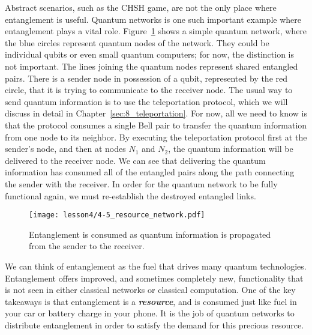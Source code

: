 Abstract scenarios, such as the CHSH game, are not the only place where entanglement is useful.
Quantum networks is one such important example where entanglement plays a vital role.
Figure~\ref{fig:4-5_resource_network} shows a simple quantum network, where the blue circles represent quantum nodes of the network.
They could be individual qubits or even small quantum computers; for now, the distinction is not important.
The lines joining the quantum nodes represent shared entangled pairs.
There is a sender node in possession of a qubit, represented by the red circle, that it is trying to communicate to the receiver node.
The usual way to send quantum information is to use the teleportation protocol, which we will discuss in detail in Chapter~\ref{sec:8_teleportation}.
For now, all we need to know is that the protocol consumes a single Bell pair to transfer the quantum information from one node to its neighbor.
By executing the teleportation protocol first at the sender's node, and then at nodes $N_1$ and $N_2$, the quantum information will be delivered to the receiver node.
We can see that delivering the quantum information has consumed all of the entangled pairs along the path connecting the sender with the receiver.
In order for the quantum network to be fully functional again, we must re-establish the destroyed entangled links.

\begin{figure}[t]
    \centering
    \texttt{[image: lesson4/4-5\_resource\_network.pdf]}
    \caption[Consumption of entanglement in a quantum network.]{Entanglement is consumed as quantum information is propagated from the sender to the receiver.}
    \label{fig:4-5_resource_network}
\end{figure}

We can think of entanglement as the fuel that drives many quantum technologies. Entanglement offers improved, and sometimes completely new, functionality that is not seen in either classical networks or classical computation.
One of the key takeaways is that entanglement is a \textbf{\emph{resource}}, and is consumed just like fuel in your car or battery charge in your phone.
It is the job of quantum networks to distribute entanglement in order to satisfy the demand for this precious resource.


